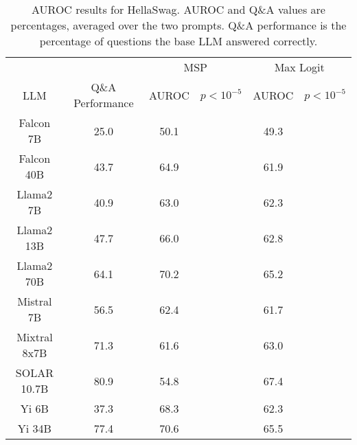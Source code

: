 \begin{table*}
\centering
\begin{tabular}{c|c|c|c|c|c}
& & \multicolumn{2}{c|}{MSP} & \multicolumn{2}{c}{Max Logit} \\ 
LLM & Q\&A Performance & AUROC & $p < 10^{-5}$ & AUROC & $p < 10^{-5}$\\ \hline
Falcon 7B & 25.0 & 50.1 &  & 49.3 & \\
Falcon 40B & 43.7 & 64.9 &  & 61.9 & \\
Llama2 7B & 40.9 & 63.0 &  & 62.3 & \\
Llama2 13B & 47.7 & 66.0 &  & 62.8 & \\
Llama2 70B & 64.1 & 70.2 &  & 65.2 & \\
Mistral 7B & 56.5 & 62.4 &  & 61.7 & \\
Mixtral 8x7B & 71.3 & 61.6 &  & 63.0 & \\
SOLAR 10.7B & 80.9 & 54.8 &  & 67.4 & \\
Yi 6B & 37.3 & 68.3 &  & 62.3 & \\
Yi 34B & 77.4 & 70.6 &  & 65.5 & \\
\hline
\end{tabular}
\caption{AUROC results for HellaSwag. AUROC and Q\&A values are percentages, averaged over the two prompts. Q\&A performance is the percentage of questions the base LLM answered correctly.}
\label{tab:hellaswag_auroc}
\end{table*}
